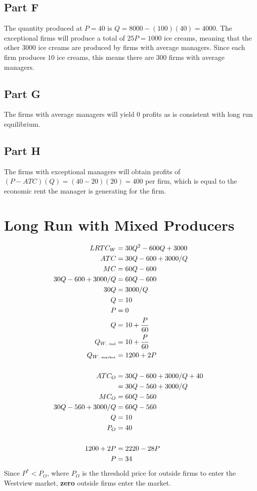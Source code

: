\documentclass[8pt]{extarticle}
\begin{document}
{\subsection*{Part F}
The quantity produced at $P = 40$ is $Q = 8000-(100)(40) = 4000$. The exceptional firms will produce a total of $25P = 1000$ ice creams, meaning that the other $3000$ ice creams are produced by firms with average managers. Since each firm produces $10$ ice creams, this means there are $\boxed{300}$ firms with average managers.
\subsection*{Part G}
The firms with average managers will yield $0$ profits as is consistent with long run equilibrium.
\subsection*{Part H}
The firms with exceptional managers will obtain profits of $(P-ATC)(Q) = (40 - 20)(20) = 400$ per firm, which is equal to the economic rent the manager is generating for the firm.
\section*{Long Run with Mixed Producers}
\begin{align*}
	LRTC_{W} &= 30Q^2 - 600Q + 3000 \\
	ATC &= 30Q - 600 + 3000/Q \\
	MC &= 60Q - 600 \\
	30Q - 600 + 3000/Q &= 60Q - 600 \\
	30Q &= 3000/Q \\
	Q &= 10 \\
	P &= 0\\
	Q &= 10 + \frac{P}{60}  \\
	Q_{W\textrm{\tiny , ind}} &= 10 + \frac{P}{60} \\
	Q_{W \textrm{\tiny, market}} &= 1200 + 2P \\
	\\
	ATC_{O} &= 30Q - 600 + 3000/Q + 40 \\
	&= 30Q - 560 + 3000/Q \\
	MC_{O} &= 60Q - 560 \\
	30Q - 560 + 3000/Q &= 60Q - 560 \\
	Q &= 10 \\
	P_O &= 40 \\
	\\
	1200 + 2P &= 2220-28P \\
	P &= 34
\end{align*}
Since $P^{*} < P_{O}$, where $P_O$ is the threshold price for outside firms to enter the Westview market, \textbf{zero} outside firms enter the market.
}
\end{document}
